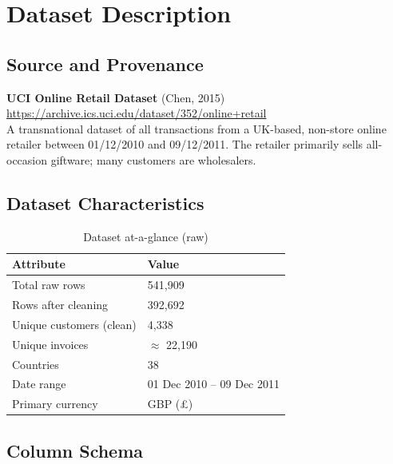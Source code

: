 \documentclass[12pt,a4paper]{report}
\begin{document}
\chapter{Dataset Description}

\section{Source and Provenance}

\begin{infobox}
\textbf{UCI Online Retail Dataset} (Chen, 2015) \\
\url{https://archive.ics.uci.edu/dataset/352/online+retail} \\[4pt]
A transnational dataset of all transactions from a UK-based, non-store online retailer between 01/12/2010 and 09/12/2011. The retailer primarily sells all-occasion giftware; many customers are wholesalers.
\end{infobox}

\section{Dataset Characteristics}

\begin{table}[H]
\centering
\caption{Dataset at-a-glance (raw)}
\begin{tabular}{ll}
\toprule
\textbf{Attribute} & \textbf{Value} \\
\midrule
Total raw rows & 541,909 \\
Rows after cleaning & 392,692 \\
Unique customers (clean) & 4,338 \\
Unique invoices & $\approx$ 22,190 \\
Countries & 38 \\
Date range & 01 Dec 2010 -- 09 Dec 2011 \\
Primary currency & GBP (£) \\
\bottomrule
\end{tabular}
\end{table}

\section{Column Schema}
\end{document}
